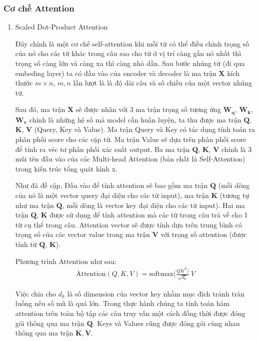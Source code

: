 \subsubsection{Cơ chế Attention}
\begin{enumerate}
    \item {Scaled Dot-Product Attention}

    Đây chính là một cơ chế self-attention khi mỗi từ có thể điều chỉnh trọng số của nó cho các từ khác trong câu sao cho từ ở vị trí càng gần nó nhất thì trọng số càng lớn và càng xa thì càng nhỏ dần. Sau bước nhúng từ (đi qua embeding layer) ta có đầu vào của encoder và decoder là ma trận $\mathbf{X}$ kích thước $m\times n$, $m,n$ lần lượt là là độ dài câu và số chiều của một vector nhúng từ.

    Sau đó, ma trận $\mathbf{X}$ sẽ được nhân với 3 ma trận trọng số tương ứng $\mathbf{W}_\mathbf{q}$, $\mathbf{W}_\mathbf{k}$, $\mathbf{W}_\mathbf{v}$ chính là những hệ số mà model cần huấn luyện, ta thu được ma trận $\mathbf{Q}$, $\mathbf{K}$, $\mathbf{V}$ (Query, Key và Value). Ma trận Query và Key có tác dụng tính toán ra phân phối score cho các cặp từ. Ma trận Value sẽ dựa trên phân phối score để tính ra véc tơ phân phối xác suất output. Ba ma trận $\mathbf{Q}$, $\mathbf{K}$, $\mathbf{V}$ chính là 3 mũi tên đầu vào của các Multi-head Attention (bản chất là Self-Attention) trong kiến trúc tổng quát hình x.

    Như đã đề cập, Đầu vào để tính attention sẽ bao gồm ma trận $\mathbf{Q}$ (mỗi dòng của nó là một vector query đại diện cho các từ input), ma trận $\mathbf{K}$ (tương tự như ma trận $\mathbf{Q}$, mỗi dòng là vector key đại diện cho các từ input). Hai ma trận $\mathbf{Q}$, $\mathbf{K}$ được sử dụng để tính attention mà các từ trong câu trả về cho 1 từ cụ thể trong câu. Attention vector sẽ được tính dựa trên trung bình có trọng số của các vector value trong ma trận $\mathbf{V}$ với trọng số attention (được tính từ $\mathbf{Q}$, $\mathbf{K}$).

    Phương trình Attention như sau:
    \begin{align}
        \mathrm{Attention}({Q, K, V}) = \mathrm{softmax}(\frac{{QK^T})}{\sqrt{d_k}}\ {V} \tag{xxx}
    \end{align}

    Việc chia cho $d_k$ là số dimension của vector key nhằm mục đích tránh tràn luồng nếu số mũ là quá lớn.
    Trong thực hành chúng ta tính toán hàm attention trên toàn bộ tập các câu truy vấn một cách đồng thời được đóng gói thông qua ma trận $\mathbf{Q}$. Keys và Values cũng được đóng gói cùng nhau thông qua ma trận $\mathbf{K},\mathbf{V}$.


\end{enumerate}

